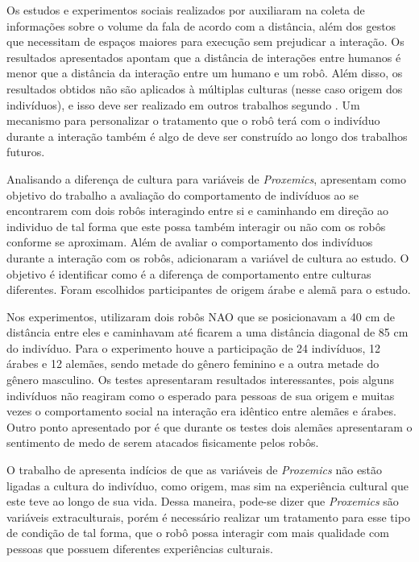 Os estudos e experimentos sociais realizados por  auxiliaram na coleta de informações sobre o volume da fala de acordo com a distância, além dos gestos que necessitam de espaços maiores para execução sem prejudicar a interação. Os resultados apresentados apontam que a distância de interações entre humanos é menor que a distância da interação entre um humano e um robô. Além disso, os resultados obtidos não são aplicados à múltiplas culturas (nesse caso origem dos indivíduos), e isso deve ser realizado em outros trabalhos segundo . Um mecanismo para personalizar o tratamento que o robô terá com o indivíduo durante a interação também é algo de deve ser construído ao longo dos trabalhos futuros.

Analisando a diferença de cultura para variáveis de \emph{Proxemics},  apresentam como objetivo do trabalho a avaliação do comportamento de indivíduos ao se encontrarem com dois robôs interagindo entre si e caminhando em direção ao individuo de tal forma que este possa também interagir ou não com os robôs conforme se aproximam. Além de avaliar o comportamento dos indivíduos durante a interação com os robôs,  adicionaram a variável de cultura ao estudo. O objetivo é identificar como é a diferença de comportamento entre culturas diferentes. Foram escolhidos participantes de origem árabe e alemã para o estudo.

Nos experimentos,  utilizaram dois robôs NAO que se posicionavam a 40 cm de distância entre eles e caminhavam até ficarem a uma distância diagonal de 85 cm do indivíduo. Para o experimento houve a participação de 24 indivíduos, 12 árabes e 12 alemães, sendo metade do gênero feminino e a outra metade do gênero masculino. Os testes apresentaram resultados interessantes, pois alguns indivíduos não reagiram como o esperado para pessoas de sua origem e muitas vezes o comportamento social na interação era idêntico entre alemães e árabes. Outro ponto apresentado por  é que durante os testes dois alemães apresentaram o sentimento de medo de serem atacados fisicamente pelos robôs.

O trabalho de  apresenta indícios de que as variáveis de \emph{Proxemics} não estão ligadas a cultura do indivíduo, como origem, mas sim na experiência cultural que este teve ao longo de sua vida. Dessa maneira, pode-se dizer que \emph{Proxemics} são variáveis extraculturais, porém é necessário realizar um tratamento para esse tipo de condição de tal forma, que o robô possa interagir com mais qualidade com pessoas que possuem diferentes experiências culturais.

